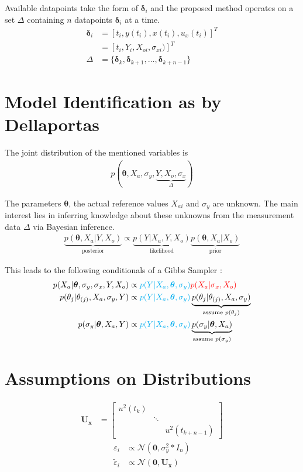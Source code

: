 \documentclass[10pt]{article}
\renewcommand{\vec}[1]{\boldsymbol{#1}}
\newcommand{\mat}[1]{\boldsymbol{#1}}
\begin{document}
Available datapoints take the form of $\vec{\delta}_i$ and the proposed method operates on a set $\Delta$ containing $n$ datapoints $\vec{\delta}_i$ at a time.
\begin{align}
    \vec{\delta}_i &= [t_i, y(t_i), x(t_i), u_x(t_i)]^T \nonumber \\
                 &= [t_i, Y_i, X_{oi}, \sigma_{xi})]^T \\
    \Delta &= \{\vec{\delta}_k, \vec{\delta}_{k+1}, \dots,  \vec{\delta}_{k+n-1}\} 
\end{align}


\section{Model Identification as by Dellaportas}
The joint distribution of the mentioned variables is
\begin{align}
    p(\vec{\theta}, X_a, \sigma_y, \underbrace{Y, X_o, \sigma_x}_{\Delta})
\end{align}

The parameters $\vec{\theta}$, the actual reference values $X_{ai}$ and $\sigma_{y}$ are unknown.
The main interest lies in inferring knowledge about these unknowns from the measurement data $\Delta$ via Bayesian inference.
\begin{align}
    \underbrace{p(\vec{\theta}, X_a | Y, X_o)}_{\text{posterior}} \propto \underbrace{p(Y | X_a, Y, X_o)}_{\text{likelihood}} \underbrace{p(\vec{\theta}, X_a | X_o)}_{\text{prior}}
\end{align}

This leads to the following conditionals of a Gibbs Sampler \cite{dellaportas_1995}:
\begin{align}
    p(X_a | \vec{\theta}, \sigma_y, \sigma_x, Y, X_o) &\propto {\color{cyan} p(Y | X_a, \vec{\theta}, \sigma_y)} {\color{red} p(X_a | \sigma_x, X_o)} \\
    p(\theta_j | \theta_{(j)}, X_a, \sigma_y, Y) &\propto {\color{cyan} p(Y | X_a, \vec{\theta}, \sigma_y)} \underbrace{p(\theta_j | \theta_{(j)}, X_a, \sigma_{y})}_{\text{assume } p(\theta_j)} \\
    p(\sigma_y | \vec{\theta}, X_a, Y) &\propto {\color{cyan} p(Y | X_a, \vec{\theta}, \sigma_y)} \underbrace{p(\sigma_y | \vec{\theta}, X_a)}_{\text{assume } p(\sigma_y)} 
\end{align}


\section{Assumptions on Distributions}
\begin{align}
    \mat{U_x} &= \begin{bmatrix} u^2(t_k) && \\ &\ddots& \\ && u^2(t_{k+n-1}) \end{bmatrix} 
\end{align}
\begin{align}
    \varepsilon_i &\propto \mathcal{N}(\vec{0}, \sigma_y^2 * I_n)\\
    \tilde{\varepsilon}_i &\propto \mathcal{N}(\vec{0}, \mat{U_x}) \\
\end{align}
\end{document}
